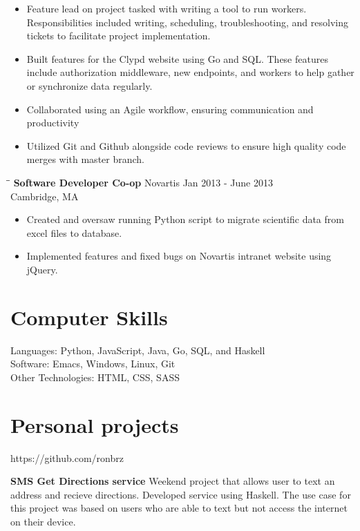 \documentclass{res}
\begin{document}
\begin{resume}
\begin{itemize}
\item Feature lead on project tasked with writing a tool to run workers. Responsibilities
  included writing, scheduling, troubleshooting, and resolving tickets to facilitate project
  implementation.
\item Built features for the Clypd website using Go and SQL. These features include
  authorization middleware, new endpoints, and workers to help gather or synchronize data
  regularly.
\item Collaborated using an Agile workflow, ensuring communication and productivity
\item Utilized Git and Github alongside code reviews to ensure high quality code merges with
  master branch.
\end{itemize}
\vspace{-.2in}
   \begin{tabbing}
   \hspace{2.3in}\= \hspace{2.6in}\= \kill %
    {\bf Software Developer Co-op} \>Novartis \> Jan 2013 - June 2013\\
    \>Cambridge, MA
   \end{tabbing}%
   \begin{itemize} \itemsep -2pt
   \item Created and oversaw running Python script to migrate scientific data from excel files
     to database.
   \item Implemented features and fixed bugs on Novartis intranet website using jQuery.
   \end{itemize}
\vspace{-.2in}
\section{Computer Skills}
Languages:  Python, JavaScript, Java, Go, SQL, and Haskell \\
Software: Emacs, Windows, Linux, Git  \\
Other Technologies:  HTML, CSS,  SASS
\section{Personal projects}
        \centerline{https://github.com/ronbrz}\vspace{-.1in} 
        {\bf SMS Get Directions service} Weekend project that allows user to text an address
        and recieve directions. Developed service using Haskell. The use case for this project
        was based on users who are able to text but not access the internet on their device. \\


\end{resume}
\end{document}

